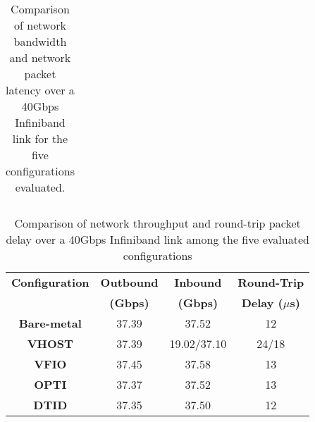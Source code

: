 {\begin{table}[tbp]
\begin{tabular}{|l|l|l|l|}
\end{tabular}
\caption{Comparison of network bandwidth and network packet latency over a
40Gbps Infiniband link for the five configurations evaluated.}
\label{tab:network_performance}
\end{table}
}

\begin{table}
\renewcommand{\arraystretch}{1.2}
\small
\begin{center}
\begin{tabular}{|c|c|c|c|} \hline
{\bf Configuration} & {\bf Outbound} & {\bf Inbound}  & {\bf Round-Trip} \\ 
 & {\bf (Gbps)} & {\bf (Gbps)} & {\bf Delay ($\mu$s)} \\ \hline
 {\bf Bare-metal}  & 37.39 & 37.52 & 12\\ \hline
 {\bf VHOST} & 37.39 & 19.02/37.10 & 24/18\\ \hline
{\bf VFIO}  & 37.45 & 37.58 & 13\\ \hline
 {\bf OPTI} & 37.37 & 37.52 & 13\\ \hline
 {\bf DTID} & 37.35 & 37.50 & 12\\ \hline
\end{tabular}
\end{center}
\vspace{-0.1in}
\caption{Comparison of network throughput and round-trip packet delay over a
40Gbps Infiniband link among the five evaluated configurations}
\label{tab:network_performance}
\vspace{-0.1in}
\end{table}


